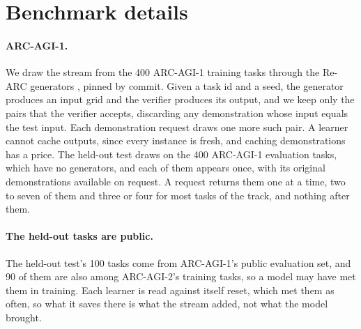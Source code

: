 \section{Benchmark details}
\label{app:bench}

\paragraph{ARC-AGI-1.} We draw the stream from the 400 ARC-AGI-1 training tasks through the Re-ARC generators \citep{hodel2024rearc}, pinned by commit. Given a task id and a seed, the generator produces an input grid and the verifier produces its output, and we keep only the pairs that the verifier accepts, discarding any demonstration whose input equals the test input. Each demonstration request draws one more such pair. A learner cannot cache outputs, since every instance is fresh, and caching demonstrations has a price. The held-out test draws on the 400 ARC-AGI-1 evaluation tasks, which have no generators, and each of them appears once, with its original demonstrations available on request. A request returns them one at a time, two to seven of them and three or four for most tasks of the track, and nothing after them.

\paragraph{The held-out tasks are public.} The held-out test's 100 tasks come from ARC-AGI-1's public evaluation set, and 90 of them are also among ARC-AGI-2's training tasks, so a model may have met them in training. Each learner is read against itself reset, which met them as often, so what it saves there is what the stream added, not what the model brought.


